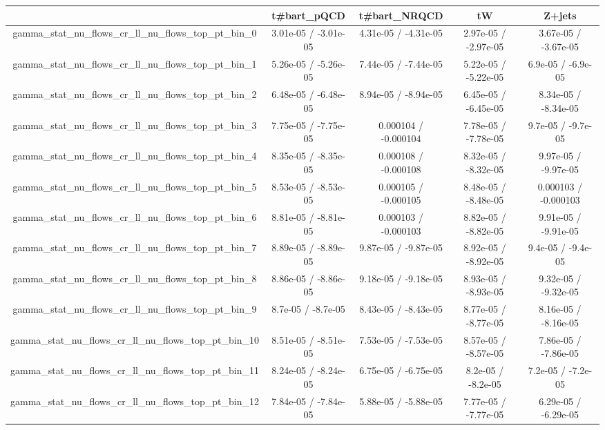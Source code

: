 \documentclass[10pt]{article}
\begin{document}
\begin{table}[htbp]
\begin{center}
\begin{tabular}{|c|c|c|c|c|}
\hline 
      & t#bar{t}_{pQCD}      & t#bar{t}_{NRQCD}      & tW      & Z+jets \\ 
\hline 
  gamma_stat_nu_flows_cr_ll_nu_flows_top_pt_bin_0 & 3.01e-05 / -3.01e-05 & 4.31e-05 / -4.31e-05 & 2.97e-05 / -2.97e-05 & 3.67e-05 / -3.67e-05 \\ 
  gamma_stat_nu_flows_cr_ll_nu_flows_top_pt_bin_1 & 5.26e-05 / -5.26e-05 & 7.44e-05 / -7.44e-05 & 5.22e-05 / -5.22e-05 & 6.9e-05 / -6.9e-05 \\ 
  gamma_stat_nu_flows_cr_ll_nu_flows_top_pt_bin_2 & 6.48e-05 / -6.48e-05 & 8.94e-05 / -8.94e-05 & 6.45e-05 / -6.45e-05 & 8.34e-05 / -8.34e-05 \\ 
  gamma_stat_nu_flows_cr_ll_nu_flows_top_pt_bin_3 & 7.75e-05 / -7.75e-05 & 0.000104 / -0.000104 & 7.78e-05 / -7.78e-05 & 9.7e-05 / -9.7e-05 \\ 
  gamma_stat_nu_flows_cr_ll_nu_flows_top_pt_bin_4 & 8.35e-05 / -8.35e-05 & 0.000108 / -0.000108 & 8.32e-05 / -8.32e-05 & 9.97e-05 / -9.97e-05 \\ 
  gamma_stat_nu_flows_cr_ll_nu_flows_top_pt_bin_5 & 8.53e-05 / -8.53e-05 & 0.000105 / -0.000105 & 8.48e-05 / -8.48e-05 & 0.000103 / -0.000103 \\ 
  gamma_stat_nu_flows_cr_ll_nu_flows_top_pt_bin_6 & 8.81e-05 / -8.81e-05 & 0.000103 / -0.000103 & 8.82e-05 / -8.82e-05 & 9.91e-05 / -9.91e-05 \\ 
  gamma_stat_nu_flows_cr_ll_nu_flows_top_pt_bin_7 & 8.89e-05 / -8.89e-05 & 9.87e-05 / -9.87e-05 & 8.92e-05 / -8.92e-05 & 9.4e-05 / -9.4e-05 \\ 
  gamma_stat_nu_flows_cr_ll_nu_flows_top_pt_bin_8 & 8.86e-05 / -8.86e-05 & 9.18e-05 / -9.18e-05 & 8.93e-05 / -8.93e-05 & 9.32e-05 / -9.32e-05 \\ 
  gamma_stat_nu_flows_cr_ll_nu_flows_top_pt_bin_9 & 8.7e-05 / -8.7e-05 & 8.43e-05 / -8.43e-05 & 8.77e-05 / -8.77e-05 & 8.16e-05 / -8.16e-05 \\ 
  gamma_stat_nu_flows_cr_ll_nu_flows_top_pt_bin_10 & 8.51e-05 / -8.51e-05 & 7.53e-05 / -7.53e-05 & 8.57e-05 / -8.57e-05 & 7.86e-05 / -7.86e-05 \\ 
  gamma_stat_nu_flows_cr_ll_nu_flows_top_pt_bin_11 & 8.24e-05 / -8.24e-05 & 6.75e-05 / -6.75e-05 & 8.2e-05 / -8.2e-05 & 7.2e-05 / -7.2e-05 \\ 
  gamma_stat_nu_flows_cr_ll_nu_flows_top_pt_bin_12 & 7.84e-05 / -7.84e-05 & 5.88e-05 / -5.88e-05 & 7.77e-05 / -7.77e-05 & 6.29e-05 / -6.29e-05 \\ 

\end{tabular}
\end{center}
\end{table}
\end{document}

